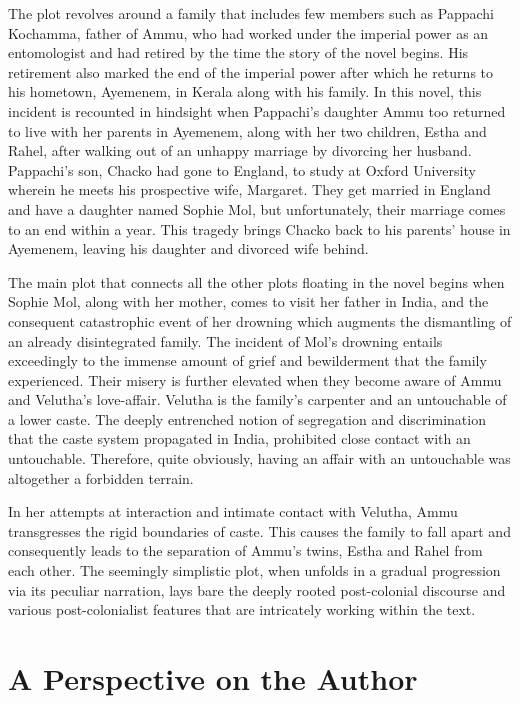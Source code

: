 The plot revolves around a family that includes few members such as Pappachi Kochamma, father of Ammu, who had worked under the imperial power as an entomologist and had retired by the time the story of the novel begins. His retirement also marked the end of the imperial power after which he returns to his hometown, Ayemenem, in Kerala along with his family. In this novel, this incident is recounted in hindsight when Pappachi’s daughter Ammu too returned to live with her parents in Ayemenem, along with her two children, Estha and Rahel, after walking out of an unhappy marriage by divorcing her husband. Pappachi’s son, Chacko had gone to England, to study at Oxford University wherein he meets his prospective wife, Margaret. They get married in England and have a daughter named Sophie Mol, but unfortunately, their marriage comes to an end within a year. This tragedy brings Chacko back to his parents’ house in Ayemenem, leaving his daughter and divorced wife behind.

The main plot that connects all the other plots floating in the novel begins when Sophie Mol, along with her mother, comes to visit her father in India, and the consequent catastrophic event of her drowning which augments the dismantling of an already disintegrated family. The incident of Mol’s drowning entails exceedingly to the immense amount of grief and bewilderment that the family experienced. Their misery is further elevated when they become aware of Ammu and Velutha’s love-affair. Velutha is the family’s carpenter and an untouchable of a lower caste. The deeply entrenched notion of segregation and discrimination that the caste system propagated in India, prohibited close contact with an untouchable. Therefore, quite obviously, having an affair with an untouchable was altogether a forbidden terrain.

In her attempts at interaction and intimate contact with Velutha, Ammu transgresses the rigid boundaries of caste. This causes the family to fall apart and consequently leads to the separation of Ammu’s twins, Estha and Rahel from each other. The seemingly simplistic plot, when unfolds in a gradual progression via its peculiar narration, lays bare the deeply rooted post-colonial discourse and various post-colonialist features that are intricately working within the text. \parencite[165]{Nayar}

\section{A Perspective on the Author}

